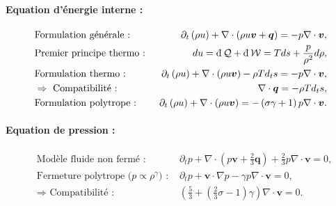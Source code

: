 {\begin{minipage}[c]{\linewidth}
\paragraph{Equation d'énergie interne :} 
\begin{eqnarray}
\label{eq:synth_cpi_u} &\text{Formulation générale : }& \partial_t \left(\rho u\right) +\nabla \cdot \left(\rho u \boldsymbol{v} + \boldsymbol{q}\right)   = - p \nabla \cdot \boldsymbol{v} ,\\
\label{eq:synth_L1_du} &\text{Premier principe thermo : }& du =  \dj \mathcal{Q} + \dj \mathcal{W} = Tds + \frac{p}{\rho^2} d\rho , \\
\label{eq:synth_L1_u} &\text{Formulation thermo : }& \partial_t \left(\rho u\right) +\nabla \cdot \left(\rho u \boldsymbol{v}\right) - \rho T d_t s  = - p \nabla \cdot \boldsymbol{v}, \\
\label{eq:synth_L1_compu} &\Rightarrow \text{ Compatibilité : }& \nabla \cdot \boldsymbol{q} =  - \rho T d_t s , \\
\label{eq:synth_pol_u} &\text{Formulation polytrope : }& \partial_t \left(\rho u\right) +\nabla \cdot \left(\rho u \boldsymbol{v}\right)   = - \left(\sigma \gamma + 1 \right)p \nabla \cdot \boldsymbol{v} .
\end{eqnarray}

\paragraph{Equation de pression : }
\begin{eqnarray}
\label{eq:synth_cpi_p} &\text{Modèle fluide non fermé : }& \partial_t p + \nabla \cdot \left(  p\boldsymbol{v} + \frac{2}{3}\boldsymbol{q}\right) + \frac{2}{3} p \nabla \cdot \boldsymbol{v}  = 0 ,\\
\label{eq:synth_pol_p} &\text{Fermeture polytrope ($p \propto \rho^{\gamma}$) : }& \partial_t p + \boldsymbol{v} \cdot \nabla p - \gamma p \nabla \cdot \boldsymbol{v} = 0 ,\\
\label{eq:synth_cpi_comp} &\Rightarrow \text{ Compatibilité : }& \left(\frac{5}{3} + \left(\frac{2}{3}\sigma -1\right) \gamma\right)\nabla \cdot \boldsymbol{v} = 0 .
\end{eqnarray}

\end{minipage}}

